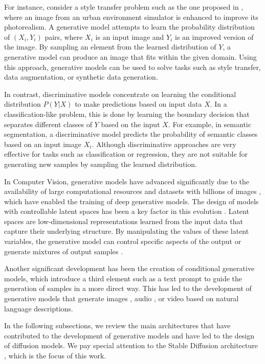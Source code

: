 For instance, consider a style transfer problem such as the one proposed in \cite{GUO2020127},  where an image from an urban environment simulator is enhanced to improve its photorealism. A generative model attempts to learn the probability distribution of $(X_i, Y_i)$ pairs, where $X_i$ is an input image and $Y_i$ is an improved version of the image. By sampling an element from the learned distribution of $Y$, a generative model can produce an image that fits within the given domain. Using this approach, generative models can be used to solve tasks such as style transfer, data augmentation, or synthetic data generation.

In contrast, discriminative models concentrate on learning the conditional distribution $P(Y|X)$ to make predictions based on input data $X$. In a classification-like problem, this is done by learning the boundary decision that separates different classes of $Y$ based on the input $X$. For example, in semantic segmentation, a discriminative model predicts the probability of semantic classes based on an input image $X_i$. Although discriminative approaches are very effective for tasks such as classification or regression, they are not suitable for generating new samples by sampling the learned distribution.

In Computer Vision, generative models have advanced significantly due to the availability of large computational resources and datasets with billions of images \cite{schuhmann2022laionb}, which have enabled the training of deep generative models. The design of models with controllable latent spaces has been a key factor in this evolution \cite{Asperti2022}. Latent spaces are low-dimensional representations learned from the input data that capture their underlying structure. By manipulating the values of these latent variables, the generative model can control specific aspects of the output or generate mixtures of output samples \cite{shen2020interpreting}.

Another significant development has been the creation of conditional generative models, which introduce a third element such as a text prompt to guide the generation of samples in a more direct way. This has led to the development of generative models that generate images \cite{rombach2022high, Dalle2}, audio \cite{liu2023audioldm}, or video \cite{ho2022imagen} based on natural language descriptions.

In the following subsections, we review the main architectures that have contributed to the development of generative models and have led to the design of diffusion models\cite{HoEtAl2020}. We pay special attention to the Stable Diffusion architecture \cite{rombach2022high}, which is the focus of this work.


